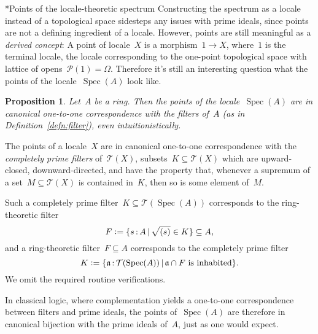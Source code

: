 \documentclass[10pt,reqno,a4paper]{amsbook}
\makeatletter
\theoremstyle{definition}
\theoremstyle{plain}
\newtheorem{prop}[defn]{Proposition}
\theoremstyle{remark}
\renewcommand{\P}{\mathcal{P}}
\newcommand{\T}{\mathcal{T}}
\newcommand{\aaa}{\mathfrak{a}}
\DeclareMathOperator{\Spec}{Spec}
\newcommand{\Open}{\T}
\newcommand{\?}{\,{:}\,}
\renewcommand{\_}{\mathpunct{.}\,}
\newcommand{\defeq}{\vcentcolon=}
\newcommand{\nocontentsline}[3]{}
\newcommand{\tocless}[1]{\let\addcontentsline=\nocontentsline}
\renewenvironment{proof}[1][\proofname]{\par
  \pushQED{\qed}%
  \normalfont \topsep6\p@\@plus6\p@\relax
  \trivlist
  \item[\hskip\labelsep
        \itshape
    #1\@addpunct{.}]\ignorespaces
}{%
  \popQED\endtrivlist\@endpefalse
}
\def\subsection{\@startsection{subsection}{2}%
  {0pt}{.5\linespacing\@plus.7\linespacing}{-.5em}%
  {\normalfont\bfseries}}
\makeatother
\begin{document}
{\tocless

\subsection*{Points of the locale-theoretic spectrum}
Constructing the spectrum as a locale instead of a topological space
sidesteps any issues with prime ideals, since points are not a defining
ingredient of a locale. However, points are still meaningful as a \emph{derived
concept}: A point of locale~$X$ is a morphism~$1 \to X$, where~$1$ is the
terminal locale, the locale corresponding to the one-point topological space
with lattice of opens~$\P(1) = \Omega$.
Therefore it's still an interesting question what the points of the
locale~$\Spec(A)$ look like.

\begin{prop}\label{prop:points-spectrum}
Let~$A$ be a ring. Then the points of the locale~$\Spec(A)$ are in
canonical one-to-one correspondence with the filters of~$A$
(as in Definition~\ref{defn:filter}), even intuitionistically.\end{prop}

\begin{proof}The points of a locale~$X$ are in canonical one-to-one
correspondence with the \emph{completely prime filters} of~$\Open(X)$,
subsets~$K \subseteq \Open(X)$ which are upward-closed, downward-directed, and
have the property that, whenever a supremum of a set~$M \subseteq \Open(X)$ is
contained in~$K$, then so is some element of~$M$.

Such a completely prime filter~$K \subseteq \Open(\Spec(A))$ corresponds to the
ring-theoretic filter
\[ F \defeq \{ s \? A \,|\, \sqrt{(s)} \in K \} \subseteq A, \]
and a ring-theoretic filter~$F \subseteq A$ corresponds to the completely prime
filter
\[ K \defeq \{ \aaa \? \Open(\Spec(A)) \,|\,
  \text{$\aaa \cap F$ is inhabited} \}. \]
We omit the required routine verifications.
\end{proof}

In classical logic, where complementation yields a one-to-one correspondence
between filters and prime ideals, the points of~$\Spec(A)$ are therefore in
canonical bijection with the prime ideals of~$A$, just as one would expect.

}
\end{document}
